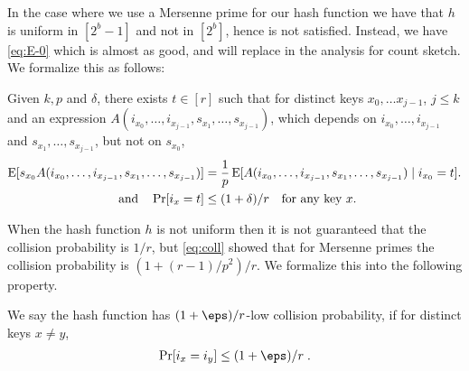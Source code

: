 In the case where we use a Mersenne prime for our hash function we have that $h$ is uniform in $[2^b - 1]$ and not in $[2^b]$, hence  is not satisfied.
Instead, we have \cref{eq:E-0} which is almost as good, and will replace  in the analysis for count sketch.
We formalize this as follows:
\begin{property}\label{prop:near-independence}
    Given $k, p$ and $\delta$,
    there exists $t \in [r]$ such that for distinct keys $x_0, \ldots x_{j - 1}$, $j \le k$
    and an expression $A(i_{x_0}, \ldots, i_{x_{j - 1}}, s_{x_1}, \dots, s_{x_{j - 1}})$,
    which depends on $i_{x_0}, \ldots, i_{x_{j - 1}}$
    and $s_{x_1}, \ldots, s_{x_{j - 1}}$,
    but not on $s_{x_0}$,
    \begin{align}
        \operatorname*{E}[s_{x_0} A(i_{x_0}, \ldots, i_{x_{j - 1}}, s_{x_1}, \ldots, s_{x_{j - 1}})]
            &= \frac1p \operatorname*{E}[A(i_{x_0}, \ldots, i_{x_{j - 1}}, s_{x_1}, \ldots, s_{x_{j - 1}}) \mid i_{x_0} = t].
         \label{eq:near-independence}
            \\
            \text{and}\quad
    \Pr[i_x = t] &\le (1 + \delta)/r
    \quad\text{for any key $x$}.
         \label{eq:prob-special-value}
    \end{align}
\end{property}

When the hash function $h$ is not uniform then it is not guaranteed that
the collision probability is $1/r$, but \eqref{eq:coll} showed that for
Mersenne primes the collision probability is $(1 + (r - 1)/p^2)/r$.
We formalize this into the following property.
\begin{property}\label{prop:collision}
   We say the hash function has $(1+\eps)/r$-low collision probability, if
    for distinct keys $x \neq y$,
    \begin{align}\label{eq:collision}
        \Pr[i_x = i_y] \le (1 + \eps)/r\; .
    \end{align}
\end{property}

